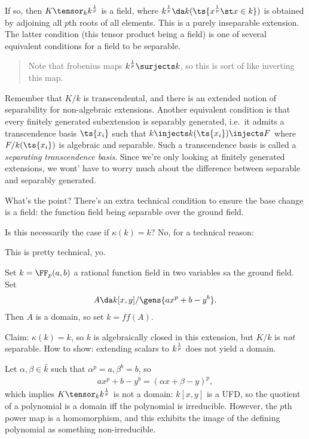 If so, then \(K\tensor_k k^{1\over p}\) is a field, where
\(k^{1\over p} \da k(\ts{x^{1\over p} \st x\in k })\) is obtained by
adjoining all \(p\)th roots of all elements. This is a purely
inseparable extension. The latter condition (this tensor product being a
field) is one of several equivalent conditions for a field to be
separable.

\begin{quote}
Note that frobenius maps \(k^{1\over p} \surjects k\), so this is sort
of like inverting this map.
\end{quote}

Remember that \(K/k\) is transcendental, and there is an extended notion
of separability for non-algebraic extensions. Another equivalent
condition is that every finitely generated subextension is separably
generated, i.e.~it admits a transcendence basis \(\ts{x_i}\) such that
\(k\injects k(\ts{x_i}) \injects F\) where \(F/k(\ts{x_i})\) is
algebraic and separable. Such a transcendence basis is called a
\emph{separating transcendence basis}. Since we're only looking at
finitely generated extensions, we wont' have to worry much about the
difference between separable and separably generated.

What's the point? There's an extra technical condition to ensure the
base change is a field: the function field being separable over the
ground field.

Is this necessarily the case if \(\kappa(k) = k\)? No, for a technical
reason:

\begin{warnings}

This is pretty technical, yo.

\end{warnings}

\begin{example}

\label{technical_example} Set \(k = \FF_p(a, b)\) a rational function
field in two variables sa the ground field. Set
\begin{align*}  
A \da k[x, y]/ \gens{ax^p + b-y^b}
.\end{align*} Then \(A\) is a domain, so set \(k = ff(A)\).

Claim: \(\kappa(k) = k\), so \(k\) is algebraically closed in this
extension, but \(K/k\) is \emph{not} separable. How to show: extending
scalars to \(k^{1\over p}\) does not yield a domain.

Let \(\alpha, \beta \in \bar k\) such that
\(\alpha^p = a, \beta^b = b\), so
\begin{align*}  
ax^p + b-y^b = (\alpha x + \beta - y)^p
,\end{align*} which implies \(K \tensor_k k^{1\over p}\) is not a
domain: \(k[x, y]\) is a UFD, so the quotient of a polynomial is a
domain iff the polynomial is irreducible. However, the \(p\)th power map
is a homomorphism, and this exhibits the image of the defining
polynomial as something non-irreducible.

\end{example}

